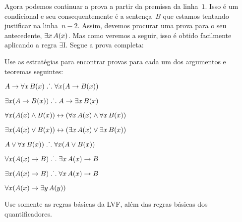 \begin{fitchproof}
	\open
	\ellipsesline
	\close
\end{fitchproof}
Agora podemos continuar a prova a partir da premissa da linha~$1$. Isso \'e um condicional e seu consequentemente \'e a senten\c ca~$B$ que estamos tentando justificar na linha~$n-2$. Assim, devemos procurar uma prova para o seu antecedente, $\exists x\,\mathord{A}(x)$. Mas  como veremos a seguir, isso \'e obtido  facilmente aplicando a regra  $\exists$I.   Segue a prova completa:\begin{fitchproof}
	\open
	\close
\end{fitchproof}

\practiceproblems

\problempart
Use as estrat\'egias  para encontrar provas para cada um dos  argumentos e teoremas seguintes:
 
\begin{earg}
\item $A \rightarrow \forall x\,\mathord{B}(x) \mathrel{\ldotp\dot{}\,\ldotp} \forall x(A \rightarrow \mathord{B}(x))$
\item $\exists x(A \rightarrow \mathord{B}(x)) \mathrel{\ldotp\dot{}\,\ldotp} A \rightarrow \exists x\, \mathord{B}(x)$
\item $\forall x(\mathord{A}(x) \wedge \mathord{B}(x)) \leftrightarrow (\forall x\,\mathord{A}(x) \wedge \forall x\,\mathord{B}(x))$
\item $\exists x(\mathord{A}(x) \vee \mathord{B}(x)) \leftrightarrow (\exists x\,\mathord{A}(x) \vee \exists x\,\mathord{B}(x))$
\item $A \vee \forall x\,\mathord{B}(x)) \mathrel{\ldotp\dot{}\,\ldotp} \forall x(A \vee \mathord{B}(x))$
\item $\forall x(\mathord{A}(x) \rightarrow B) \mathrel{\ldotp\dot{}\,\ldotp} \exists x\,\mathord{A}(x) \rightarrow B$
\item $\exists x(\mathord{A}(x) \rightarrow B) \mathrel{\ldotp\dot{}\,\ldotp} \forall x\,\mathord{A}(x) \rightarrow B$
\item $\forall x(\mathord{A}(x) \rightarrow \exists y\,\mathord{A}(y))$
\end{earg}
Use somente as regras b\'asicas da LVF, al\'em das regras b\'asicas dos quantificadores.

